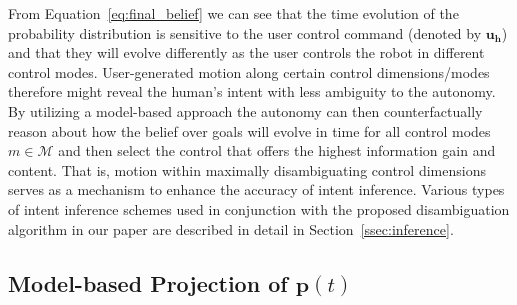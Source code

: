 \documentclass[conference]{IEEEtran}
\begin{document}
From Equation~\ref{eq:final_belief} we can see that the time evolution of the probability distribution is sensitive to the user control command (denoted by $\boldsymbol{u_h}$) and that they will evolve differently as the user controls the robot in different control modes. User-generated motion along certain control dimensions/modes therefore might reveal the human's intent with less ambiguity to the autonomy. By utilizing a model-based approach the autonomy can then counterfactually reason about how the belief over goals will evolve in time for all control modes $m \in \mathcal{M}$ and then select the control that offers the highest information gain and content. That is, motion within maximally disambiguating control dimensions serves as a mechanism to enhance the accuracy of intent inference. Various types of intent inference schemes used in conjunction with the proposed disambiguation algorithm in our paper are described in detail in Section~\ref{ssec:inference}. 


\subsection{Model-based Projection of $\boldsymbol{p}(t)$}
\end{document}
